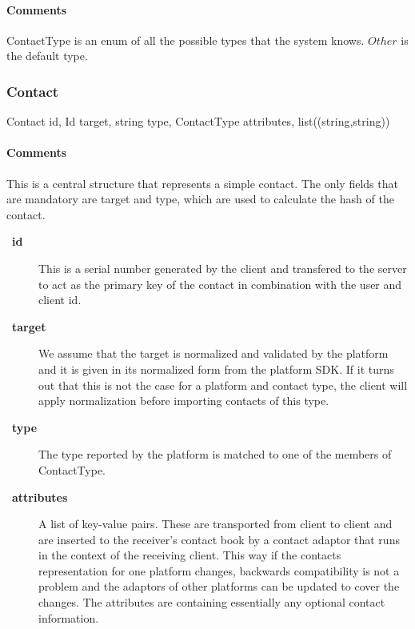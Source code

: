 \documentclass[a4paper,10pt]{article}
\let\Item\item
\newcommand\SpecialItem{\renewcommand\item[1][]{\Item[\textbullet~\bfseries##1]}
}
\begin{document}
\paragraph*{Comments}
ContactType is an enum of all the possible types that the system knows. $Other$ is the default type.

\subsubsection{Contact}
\label{sec:structure:client:contact}

\begin{verbbox}
Contact
{
  id, Id
  target, string
  type, ContactType
  attributes, list((string,string))
}
\end{verbbox}
\begin{center}
\theverbbox
\end{center}

\begin{inparaitem}[ ]
 \item \infrastructure
\end{inparaitem}

\paragraph*{Comments}
This is a central structure that represents a simple contact. The only fields that are mandatory are target and type, which are used to calculate the hash of the contact.

\SpecialItem
\begin{description}
 \item[id] This is a serial number generated by the client and transfered to the server to act as the primary key of the contact in combination with the user and client id.
 \item[target] We assume that the target is normalized and validated by the platform and it is given in its normalized form from the platform SDK. If it turns out that this is not 
the case for a platform and contact type, the client will apply normalization before importing contacts of this type.
 \item[type] The type reported by the platform is matched to one of the members of ContactType.
 \item[attributes] A list of key-value pairs. These are transported from client to client and are inserted to the receiver's contact book by a contact adaptor that runs in the 
context of the receiving client. This way if the contacts representation for one platform changes, backwards compatibility is not a problem and the adaptors of other platforms can 
be updated to cover the changes. The attributes are containing essentially any optional contact information.
\end{description}
\end{document}
